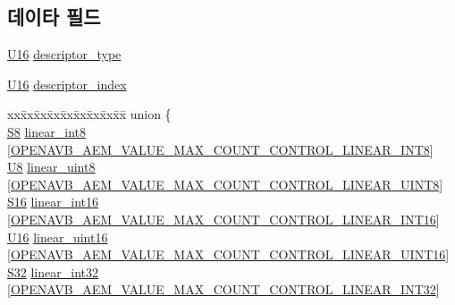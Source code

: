 \subsection*{데이타 필드}
\begin{DoxyCompactItemize}
\item 
\hyperlink{openavb__types__base__pub_8h_a0a0a322d5fa4a546d293a77ba8b4a71f}{U16} \hyperlink{structopenavb__aecp__commandresponse__data__set__control__t_a1e231d7874aada5925b29affc76782cc}{descriptor\+\_\+type}
\item 
\hyperlink{openavb__types__base__pub_8h_a0a0a322d5fa4a546d293a77ba8b4a71f}{U16} \hyperlink{structopenavb__aecp__commandresponse__data__set__control__t_ab26fb363c24b9a2a4391f9171c981b08}{descriptor\+\_\+index}
\item 
\begin{tabbing}
xx\=xx\=xx\=xx\=xx\=xx\=xx\=xx\=xx\=\kill
union \{\\
\>\hyperlink{openavb__types__base__pub_8h_af1475a0bb1962ef08dd1f78bd5dba87a}{S8} \hyperlink{structopenavb__aecp__commandresponse__data__set__control__t_a45419fbe4bd6ac07e20b168e97eef09c}{linear\_int8} \mbox{[}\hyperlink{openavb__aem__types__pub_8h_ad575315ad30a52b9095a9c75a9abc2bb}{OPENAVB\_AEM\_VALUE\_MAX\_COUNT\_CONTROL\_LINEAR\_INT8}\mbox{]}\\
\>\hyperlink{openavb__types__base__pub_8h_aa63ef7b996d5487ce35a5a66601f3e73}{U8} \hyperlink{structopenavb__aecp__commandresponse__data__set__control__t_abba20e198ce6ebb10558f9a36efff81d}{linear\_uint8} \mbox{[}\hyperlink{openavb__aem__types__pub_8h_a10723b8b51aeafeae5cbe0190b623562}{OPENAVB\_AEM\_VALUE\_MAX\_COUNT\_CONTROL\_LINEAR\_UINT8}\mbox{]}\\
\>\hyperlink{openavb__types__base__pub_8h_a6d241ad21a823c90d4835380787db5d4}{S16} \hyperlink{structopenavb__aecp__commandresponse__data__set__control__t_a971e2e30fcd86963178d3445519eccf4}{linear\_int16} \mbox{[}\hyperlink{openavb__aem__types__pub_8h_ae368778860931dd6fbe81c0ad8c8286d}{OPENAVB\_AEM\_VALUE\_MAX\_COUNT\_CONTROL\_LINEAR\_INT16}\mbox{]}\\
\>\hyperlink{openavb__types__base__pub_8h_a0a0a322d5fa4a546d293a77ba8b4a71f}{U16} \hyperlink{structopenavb__aecp__commandresponse__data__set__control__t_afd0deb9ad36fea24f7188886e6899474}{linear\_uint16} \mbox{[}\hyperlink{openavb__aem__types__pub_8h_a9f425d29d7532d609c77c5efcb2bbd14}{OPENAVB\_AEM\_VALUE\_MAX\_COUNT\_CONTROL\_LINEAR\_UINT16}\mbox{]}\\
\>\hyperlink{openavb__types__base__pub_8h_a39c786017723555afb9e8b85accec0de}{S32} \hyperlink{structopenavb__aecp__commandresponse__data__set__control__t_a0f999ad24beb8f01ba18c3059fa0769f}{linear\_int32} \mbox{[}\hyperlink{openavb__aem__types__pub_8h_a985968a860b9e18c493e864357ee476a}{OPENAVB\_AEM\_VALUE\_MAX\_COUNT\_CONTROL\_LINEAR\_INT32}\mbox{]}\\

\end{tabbing}
\end{DoxyCompactItemize}
